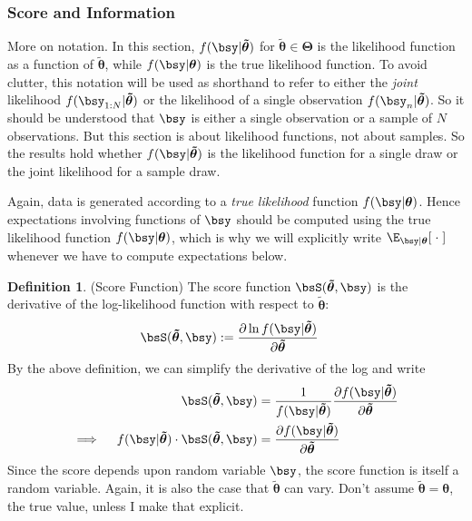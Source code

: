 \documentclass[12pt]{article}
\theoremstyle{plain}
\theoremstyle{definition}
\newtheorem{defn}[thm]{Definition}
\theoremstyle{remark}
\newcommand{\bstheta}{\boldsymbol{\theta}}
\newcommand{\bsTheta}{\boldsymbol{\Theta}}
\newcommand{\bstildetheta}{\boldsymbol{\tilde{\theta}}}
\begin{document}
\clearpage
\subsubsection{Score and Information}

More on notation. In this section, $f(\bsy|\bstildetheta)$ for
$\bstildetheta\in\bsTheta$ is the likelihood function as a function of
$\bstildetheta$, while $f(\bsy|\bstheta)$ is the true likelihood
function.  To avoid clutter, this notation will be used as shorthand to
refer to either the \emph{joint} likelihood
$f(\bsy_{1:N}|\bstildetheta)$ or the likelihood of a single observation
$f(\bsy_n|\bstildetheta)$.  So it should be understood that $\bsy$ is
either a single observation or a sample of $N$ observations.  But this
section is about likelihood functions, not about samples. So the results
hold whether $f(\bsy|\bstildetheta)$ is the likelihood function for a
single draw or the joint likelihood for a sample draw.

Again, data is generated according to a \emph{true likelihood} function
$f(\bsy|\bstheta)$. Hence expectations involving functions of $\bsy$
should be computed using the true likelihood function
$f(\bsy|\bstheta)$, which is why we will explicitly write
$\E_{\bsy|\bstheta}[\;\cdot\;]$ whenever we have to compute expectations
below.


\begin{defn}(Score Function)
The score function $\bsS(\bstildetheta,\bsy)$ is the derivative of the
log-likelihood function with respect to $\bstildetheta$:
\begin{align}
  \bsS(\bstildetheta,\bsy) &:=
  \frac{\partial \ln f(\bsy|\bstildetheta)}{\partial \bstildetheta}
  \label{score1}
\end{align}
By the above definition, we can simplify the derivative of the log and
write
\begin{align}
  \bsS(\bstildetheta,\bsy)
  &=
  \frac{1}{f(\bsy|\bstildetheta)}
  \frac{\partial f(\bsy|\bstildetheta)}{\partial \bstildetheta}
  \label{score2} \\
  \implies\quad
  f(\bsy|\bstildetheta) \cdot \bsS(\bstildetheta,\bsy)
  &=
  \frac{\partial f(\bsy|\bstildetheta)}{\partial \bstildetheta}
  \label{score3}
\end{align}
Since the score depends upon random variable $\bsy$, the score function
is itself a random variable. Again, it is also the case that
$\bstildetheta$ can vary. Don't assume $\bstildetheta=\bstheta$, the
true value, unless I make that explicit.
\end{defn}
\end{document}
